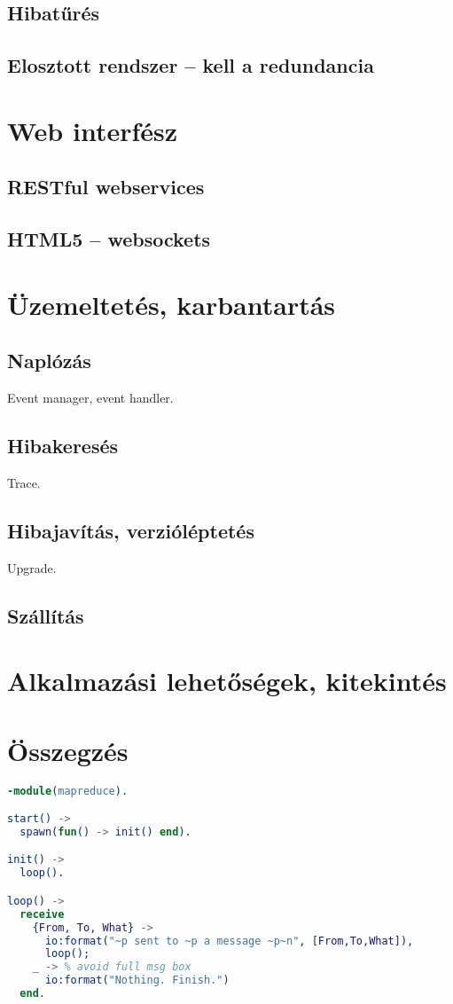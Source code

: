 \documentclass[12pt, a4paper, oneside]{book}
\begin{document}
\section{Hibatűrés}
\section{Elosztott rendszer -- kell a redundancia}

\chapter{Web interfész}
\section{RESTful webservices}
\section{HTML5 -- websockets}

\chapter{Üzemeltetés, karbantartás}
\section{Naplózás}
Event manager, event handler.
\section{Hibakeresés}
Trace.
\section{Hibajavítás, verzióléptetés}
Upgrade.
\section{Szállítás}

\chapter{Alkalmazási lehetőségek, kitekintés}

\chapter{Összegzés}
\appendix

{\footnotesize

\begin{lstlisting}[emph={fun}, emphstyle=\textbf, caption=Map reduce module, language=erlang, frame=single]
-module(mapreduce).

start() ->
  spawn(fun() -> init() end).

init() ->
  loop().

loop() ->
  receive
    {From, To, What} ->
      io:format("~p sent to ~p a message ~p~n", [From,To,What]),
      loop();
    _ -> % avoid full msg box
      io:format("Nothing. Finish.")
  end.

\end{lstlisting}
}
\end{document}
